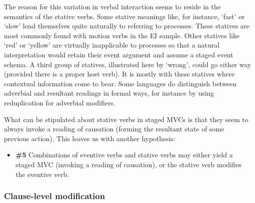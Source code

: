 {The reason for this variation in verbal interaction seems to reside in the semantics of the stative verbs. Some stative meanings like, for instance, `fast' or `slow' lend themselves quite naturally to referring to processes. These statives are most commonly found with motion verbs in the EI sample. Other statives like `red' or `yellow' are virtually inapplicable to processes so that a natural interpretation would retain their event argument and assume a staged event schema. A third group of statives, illustrated here by `wrong', could go either way (provided there is a proper host verb). It is mostly with these statives where contextual information come to bear. Some languages do distinguish between adverbial and resultant readings in formal ways, for instance by using reduplication for adverbial modifiers.

What can be stipulated about stative verbs in staged MVCs is that they seem to always invoke a reading of causation (forming the resultant state of some previous action). This leaves us with another hypothesis:

\begin{itemize}
\item \textbf{\#5} Combinations of eventive verbs and stative verbs may either yield a staged MVC (invoking a reading of causation), or the stative verb modifies the eventive verb.
\end{itemize}

\subsubsection{Clause-level modification}\label{sec:clauselevelmodification}

}
